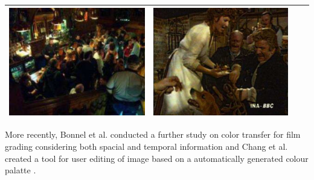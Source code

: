 \begin{longtable}{|N||c|c|c|}
\begin{minipage}{.29\textwidth}
    \includegraphics[width=\textwidth,height=\textheight,keepaspectratio]{images/pitie_target2}
  \end{minipage} & 
  \begin{minipage}{.29\textwidth}
    \includegraphics[width=\textwidth,height=\textheight,keepaspectratio]{images/pitie_result2}
  \end{minipage} \\
    \hline
\end{longtable}

More recently, Bonnel et al. conducted a further study on color transfer for film grading considering both spacial and temporal information \cite{bonneel_2013_video} and Chang et al. created a tool for user editing of image based on a automatically generated colour palatte \cite{chang_2015_palette}.

